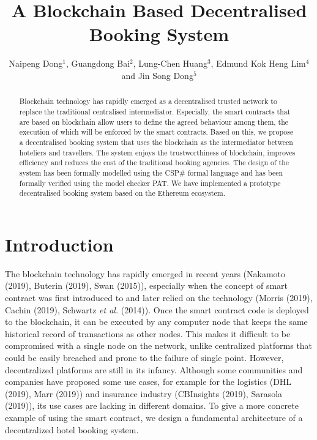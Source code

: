 \documentclass{KERauth}
\begin{document}


\onehalfspacing

\title{A Blockchain Based Decentralised Booking System}

\author{Naipeng Dong$^1$, Guangdong Bai$^2$, Lung-Chen Huang$^3$, Edmund Kok Heng Lim$^4$ and Jin Song Dong$^{5}$}
\address{$^{1,3,4,5}$School of Computing, National University of Singapore, COM$1$, $13$ Computing Drive, $117417$, Singapore\\ ~$^{2,5}$School of Information and Communication Technology, Griffith University, N$44$ $2.28$, $170$ Kessels Road Nathan, QLD, $4111$, Australia\\
, $^2$g.bai@griffith.edu.au, $^3$lungchenhuang@u.nus.edu, $^4$e0335737@u.nus.edu, $^5$dcsdjs@nus.edu.sg}


\begin{abstract}
Blockchain technology has rapidly emerged as a decentralised trusted network to replace the traditional centralised intermediator. Especially, the smart contracts that are based on blockchain allow users to define the agreed behaviour among them, the execution of which will be enforced by the smart contracts. Based on this, we propose a decentralised booking system that uses the blockchain as the intermediator between hoteliers and travellers. The system enjoys the trustworthiness of blockchain, improves efficiency and reduces the cost of the traditional booking agencies. The design of the system has been formally modelled using the CSP\# formal language and has been formally verified using the model checker PAT. We have implemented a prototype decentralised booking system based on the Ethereum ecosystem. 
\end{abstract}

\section{Introduction}

The blockchain technology has rapidly emerged in recent years (Nakamoto (2019), Buterin (2019), Swan (2015)), especially when the concept of smart contract
was first introduced to and later relied on the technology (Morris (2019), Cachin (2019), Schwartz \emph{et al.} (2014)). Once the smart contract code is deployed to the
blockchain, it can be executed by any computer node that keeps the same historical record of transactions as
other nodes. This makes it difficult to be compromised with a single node on the network, unlike centralized
platforms that could be easily breached and prone to the failure of single point. However, decentralized
platforms are still in its infancy. Although some communities and companies have proposed some use cases, for example 
for the logistics (DHL (2019), Marr (2019)) and insurance industry (CBInsights (2019), Sarasola (2019)), its use cases are lacking in different domains. To give a more concrete
example of using the smart contract, we design a fundamental architecture of a decentralized hotel booking
system.
\end{document}
